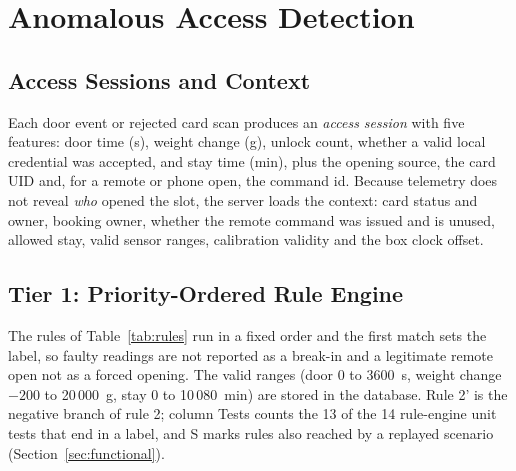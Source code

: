\documentclass[sigconf,screen]{acmart}
\begin{document}
\section{Anomalous Access Detection}\label{sec:detector}

\subsection{Access Sessions and Context}\label{sec:sessions}

Each door event or rejected card scan produces an \emph{access session} with five features: door time (s), weight
change (g), unlock count, whether a valid local credential was accepted, and stay time (min), plus the opening source,
the card UID and, for a remote or phone open, the command id. Because telemetry does not reveal \emph{who} opened the
slot, the server loads the context: card status and owner, booking owner, whether the remote command was issued and is
unused, allowed stay, valid sensor ranges, calibration validity and the box clock offset.

\subsection{Tier 1: Priority-Ordered Rule Engine}

The rules of Table~\ref{tab:rules} run in a fixed order and the first match sets the label, so faulty readings are
not reported as a break-in and a legitimate remote open not as a forced opening. The valid ranges (door 0 to 3600~s,
weight change $-200$ to 20\,000~g, stay 0 to 10\,080~min) are stored in the database. Rule 2' is the negative branch of
rule 2; column Tests counts the 13 of the 14 rule-engine unit tests that end in a label, and S marks rules also
reached by a replayed scenario (Section~\ref{sec:functional}).
\end{document}
